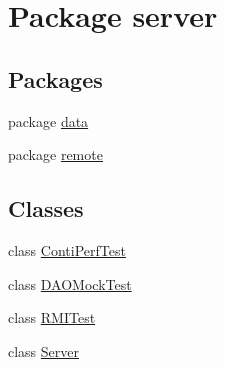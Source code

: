 \hypertarget{namespaceserver}{}\section{Package server}
\label{namespaceserver}
\subsection*{Packages}
\begin{DoxyCompactItemize}
\item 
package \hyperlink{namespaceserver_1_1data}{data}
\item 
package \hyperlink{namespaceserver_1_1remote}{remote}
\end{DoxyCompactItemize}
\subsection*{Classes}
\begin{DoxyCompactItemize}
\item 
class \hyperlink{classserver_1_1_conti_perf_test}{Conti\+Perf\+Test}
\item 
class \hyperlink{classserver_1_1_d_a_o_mock_test}{D\+A\+O\+Mock\+Test}
\item 
class \hyperlink{classserver_1_1_r_m_i_test}{R\+M\+I\+Test}
\item 
class \hyperlink{classserver_1_1_server}{Server}
\end{DoxyCompactItemize}
